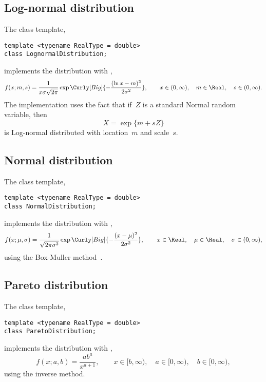 \subsection{Log-normal distribution}
\label{sub:Log-normal distribution}

The class template,
\begin{verbatim}
template <typename RealType = double>
class LognormalDistribution;
\end{verbatim}
implements the distribution with \pdf,
\begin{equation*}
  f(x;m,s) =
  \frac{1}{x\sigma\sqrt{2\pi}}
  \exp\Curly[Big]{-\frac{(\ln x - m)^2}{2\sigma^2}},\qquad
  x \in (0, \infty),\quad m \in \Real,\quad s \in (0, \infty).
\end{equation*}
The implementation uses the fact that if~$Z$ is a standard Normal random
variable, then
\begin{equation*}
  X = \exp\{m + sZ\}
\end{equation*}
is Log-normal distributed with location~$m$ and scale~$s$.

\subsection{Normal distribution}
\label{sub:Normal distribution}

The class template,
\begin{verbatim}
template <typename RealType = double>
class NormalDistribution;
\end{verbatim}
implements the distribution with \pdf,
\begin{equation*}
  f(x;\mu,\sigma) =
  \frac{1}{\sqrt{2\pi\sigma^2}}
  \exp\Curly[Big]{-\frac{(x-\mu)^2}{2\sigma^2}},\qquad
  x \in \Real,\quad \mu \in \Real,\quad \sigma \in (0, \infty),
\end{equation*}
using the Box-Muller method~\cite{Box:1958hv}.

\subsection{Pareto distribution}
\label{sub:Pareto distribution}

The class template,
\begin{verbatim}
template <typename RealType = double>
class ParetoDistribution;
\end{verbatim}
implements the distribution with \pdf,
\begin{equation*}
  f(x;a,b) = \frac{a b^a}{x^{a + 1}},\qquad
  x \in [b, \infty),\quad a \in [0, \infty),\quad b \in [0, \infty),
\end{equation*}
using the inverse method.

